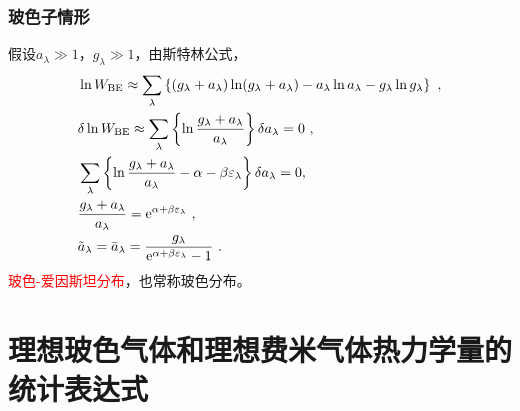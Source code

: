 \documentclass[12pt,a4paper]{article}
\begin{document}
\subsubsection{玻色子情形}
假设$a_\lambda \gg 1$，$g_\lambda \gg 1$，由斯特林公式，
\begin{align}
& \ln W_{\rm BE} \approx \sum_\lambda \left\{(g_\lambda +a_\lambda) \ln (g_\lambda +a_\lambda)  -a_\lambda \ln a_\lambda -g_\lambda \ln g_\lambda \right\} ~, \\
& \delta \ln W_{\rm BE} \approx \sum_\lambda \left\{ \ln \dfrac{g_\lambda + a_\lambda}{a_\lambda} \right\} \delta a_\lambda  = 0 ~, \\
& \sum_\lambda \left\{ \ln \dfrac{g_\lambda + a_\lambda}{a_\lambda} -\alpha -\beta \varepsilon_\lambda \right\} \delta a_\lambda = 0, \\
& \dfrac{g_\lambda + a_\lambda}{a_\lambda} = {\rm e}^{\alpha +\beta \varepsilon_\lambda} ~, \\
& \tilde{a}_\lambda = \bar{a}_\lambda = \dfrac{g_\lambda}{{\rm e}^{\alpha +\beta \varepsilon_\lambda} -1} ~.
\end{align}
\textcolor{red}{玻色-爱因斯坦分布}，也常称玻色分布。











\section{理想玻色气体和理想费米气体热力学量的统计表达式}
\end{document}
